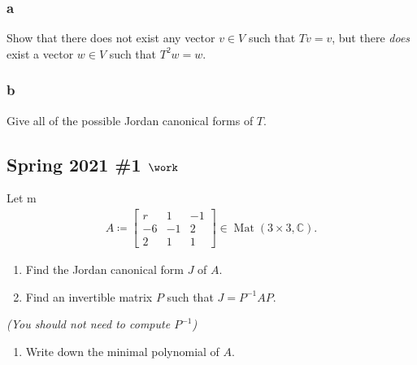 \hypertarget{a-115}{%
\subsubsection{a}\label{a-115}}

Show that there does not exist any vector \(v\in V\) such that
\(Tv = v\), but there \emph{does} exist a vector \(w\in V\) such that
\(T^2 w= w\).

\hypertarget{b-105}{%
\subsubsection{b}\label{b-105}}

Give all of the possible Jordan canonical forms of \(T\).

\hypertarget{spring-2021-1-work}{%
\subsection{\texorpdfstring{Spring 2021 \#1
\(\work\)}{Spring 2021 \#1 \textbackslash work}}\label{spring-2021-1-work}}

Let m
\begin{align*}
A \coloneqq
\begin{bmatrix}
r & 1 & -1 \\
-6 & -1 & 2 \\
2 & 1 & 1
\end{bmatrix}
\in \operatorname{Mat}(3\times 3, {\mathbb{C}})
.\end{align*}

\begin{enumerate}
\def\labelenumi{\alph{enumi}.}
\item
  Find the Jordan canonical form \(J\) of \(A\).
\item
  Find an invertible matrix \(P\) such that \(J = P ^{-1}A P\).
\end{enumerate}

\emph{(You should not need to compute \(P^{-1}\))}

\begin{enumerate}
\def\labelenumi{\alph{enumi}.}
\setcounter{enumi}{2}
\tightlist
\item
  Write down the minimal polynomial of \(A\).
\end{enumerate}


\printbibliography[title=Bibliography]



